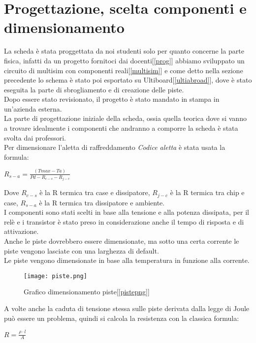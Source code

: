 \documentclass[12pt]{article}
\begin{document}
\section{Progettazione, scelta componenti e dimensionamento}
La scheda è stata proggettata da noi studenti solo per quanto concerne la parte fisica, infatti da un progetto fornitoci dai docenti[\ref{prog}] abbiamo sviluppato un circuito di multisim con 
componenti reali[\ref{multisim}] e come detto nella sezione precedente lo schema è stato poi esportato su Ultiboard[\ref{ultiabroad}], dove è stato eseguita la parte di sbrogliamento e di creazione delle piste.\\
Dopo essere stato revisionato, il progetto è stato mandato in stampa in un'azienda esterna.\\
\vskip 2mm
\noindent
La parte di progettazione iniziale della scheda, ossia quella teorica dove si vanno a trovare idealmente i componenti che andranno a comporre la scheda è stata svolta dai professori.\\
Per dimensionare l'aletta di raffreddamento \textit{Codice aletta} è stata usata la formula:

\begin{center}
$R_{s-a}=\frac{(Tmax-Ta)}{Pd-R_{c-s}-R_{j-c}}$\\
\end{center}
\noindent
Dove \textit{$R_{c-s}$} è la R termica tra case e dissipatore, \textit{$R_{j-c}$} è la R termica tra chip e case, \textit{$R_{s-a}$} è la R termica tra dissipatore e ambiente.\\
I componenti sono stati scelti in base alla tensione e alla potenza dissipata, per il relè e i transistor è stato preso in considerazione anche il tempo di risposta e di attivazione.\\
Anche le piste dovrebbero essere dimensionate, ma sotto una certa corrente le piste vengono lasciate con una larghezza di default.\\ 
Le piste vengono dimensionate in base alla temperatura in funzione alla corrente.\\

\begin{figure}[H]
  \centering
  \texttt{[image: piste.png]}
  \caption{Grafico dimensionamento piste[\ref{pistepng}]}
  \label{lepistelepistelepiste}
\end{figure}
\noindent
A volte anche la caduta di tensione stessa sulle piste derivata dalla legge di Joule può essere un problema, quindi si calcola la resistenza con la classica formula:
\begin{center}
    $\textit{R}=\frac{\rho\cdot\textit{l}}{\textit{A}}$
\end{center}
\end{document}
